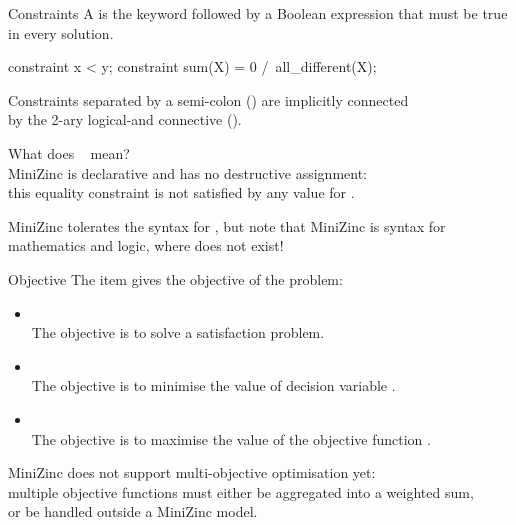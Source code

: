 \documentclass{cons-beamer}
\begin{document}
\begin{flashcardminizinc}
\begin{frame}[fragile]{Constraints}
  A  is the keyword 
  followed by a Boolean expression that must be true in every
  solution.
  \begin{examples}
    \vspace{-3mm}
    \begin{mzn}
constraint x < y;
constraint sum(X) = 0 /\ all_different(X);
    \end{mzn}
    \vspace{-2mm}
  \end{examples}
  Constraints separated by a semi-colon (\mzninline{;}) are implicitly
  connected \\ by the 2-ary logical-and connective (\mzninline{/\\}).
  \vfill

  What does ~ mean? \\ 
  MiniZinc is declarative and has no destructive assignment: \\ this
  equality \alert{constraint} is \alert{not} satisfied by any value
  for . \vfill

  MiniZinc tolerates the syntax  for
  , but note that MiniZinc is syntax for
  mathematics and logic, where \mzninline{==} does not exist!
\end{frame}

\begin{frame}{Objective}
  The  item gives the objective of the problem:
  \begin{itemize}
  \item {} \\ The objective is to solve a
    satisfaction problem.
  \item {} \\ The objective is to minimise
    the value of decision variable .
  \item {} \\ The objective is to
    maximise the value of the objective function .
  \end{itemize}\vfill
  MiniZinc does not support multi-objective optimisation yet: \\ multiple
  objective functions must either be aggregated into a weighted sum, \\
  or be handled outside a MiniZinc model.
\end{frame}


\end{flashcardminizinc}
\end{document}
